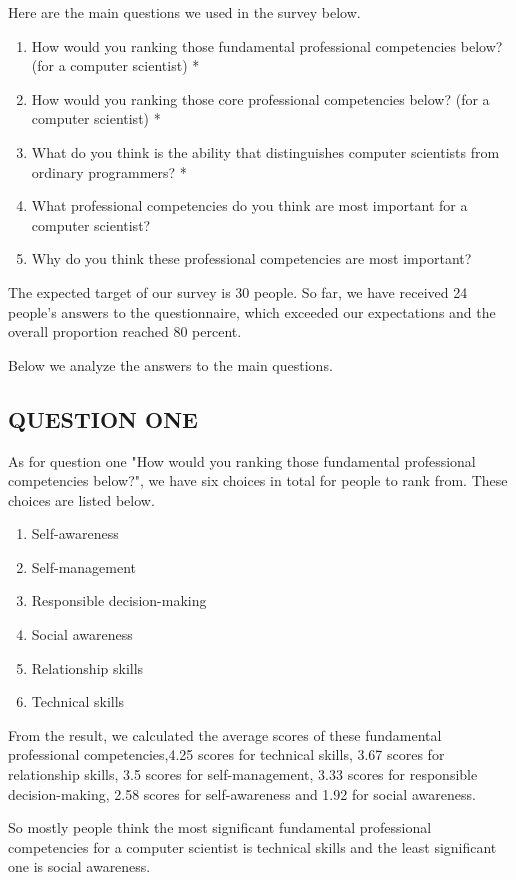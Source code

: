 \documentclass[conference]{IEEEtran}
\begin{document}
Here are the main questions we used in the survey below.
\begin{enumerate}
    \item How would you ranking those fundamental professional competencies below?(for a computer scientist) *
    \item How would you ranking those core professional competencies below? (for a computer scientist) *
    \item What do you think is the ability that distinguishes computer scientists from ordinary programmers? *
    \item What professional competencies do you think are most important for a computer scientist?
    \item Why do you think these professional competencies are most important?
    
\end{enumerate}
\par The expected target of our survey is 30 people. So far, we have received 24 people’s answers to the questionnaire, which exceeded our expectations and the overall proportion reached 80 percent.
\par Below we analyze the answers to the main questions.
\subsection{QUESTION ONE}
As for question one "How would you ranking those fundamental professional competencies below?", we have six choices in total for people to rank from. These choices are listed below.
\begin{enumerate}
    \item Self-awareness
    \item Self-management
    \item Responsible decision-making
    \item Social awareness
    \item Relationship skills
    \item Technical skills
\end{enumerate}
\par From the result, we calculated the average scores of these fundamental professional competencies,4.25 scores for technical skills, 3.67 scores for relationship skills, 3.5 scores for self-management, 3.33 scores for responsible decision-making, 2.58 scores for self-awareness and 1.92 for social awareness.
\par So mostly people think the most significant fundamental professional competencies for a computer scientist is technical skills and the least significant one is social awareness.
\end{document}

